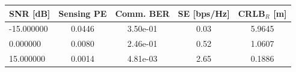\begin{tabular}{lcccc}
\toprule
SNR [dB] & Sensing PE & Comm. BER & SE [bps/Hz] & CRLB$_R$ [m] \\
\midrule
-15.000000 & 0.0446 & 3.50e-01 & 0.03 & 5.9645 \\
0.000000 & 0.0080 & 2.46e-01 & 0.52 & 1.0607 \\
15.000000 & 0.0014 & 4.81e-03 & 2.65 & 0.1886 \\
\bottomrule
\end{tabular}
